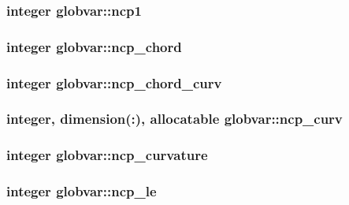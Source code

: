 \subsubsection[{ncp1}]{\setlength{\rightskip}{0pt plus 5cm}integer globvar\+::ncp1}\label{namespaceglobvar_aa5e3baef2345be01a1a377da45671712}
\hypertarget{namespaceglobvar_a8f6b996198f130f39452bc1a69c68081}{}
\subsubsection[{ncp\+\_\+chord}]{\setlength{\rightskip}{0pt plus 5cm}integer globvar\+::ncp\+\_\+chord}\label{namespaceglobvar_a8f6b996198f130f39452bc1a69c68081}
\hypertarget{namespaceglobvar_a909bbc8bd8371d224674230c41fbe759}{}
\subsubsection[{ncp\+\_\+chord\+\_\+curv}]{\setlength{\rightskip}{0pt plus 5cm}integer globvar\+::ncp\+\_\+chord\+\_\+curv}\label{namespaceglobvar_a909bbc8bd8371d224674230c41fbe759}
\hypertarget{namespaceglobvar_a4b18ca71c05db91ed78552377e4e0aa4}{}
\subsubsection[{ncp\+\_\+curv}]{\setlength{\rightskip}{0pt plus 5cm}integer, dimension(\+:), allocatable globvar\+::ncp\+\_\+curv}\label{namespaceglobvar_a4b18ca71c05db91ed78552377e4e0aa4}
\hypertarget{namespaceglobvar_a3dba06f407815715cf5e3ed177d016f0}{}
\subsubsection[{ncp\+\_\+curvature}]{\setlength{\rightskip}{0pt plus 5cm}integer globvar\+::ncp\+\_\+curvature}\label{namespaceglobvar_a3dba06f407815715cf5e3ed177d016f0}
\hypertarget{namespaceglobvar_a092659d30270778769fb935306344024}{}
\subsubsection[{ncp\+\_\+le}]{\setlength{\rightskip}{0pt plus 5cm}integer globvar\+::ncp\+\_\+le}\label{namespaceglobvar_a092659d30270778769fb935306344024}
\hypertarget{namespaceglobvar_a748fd3a637b62037c6e23eb9b0b8b75e}{}
